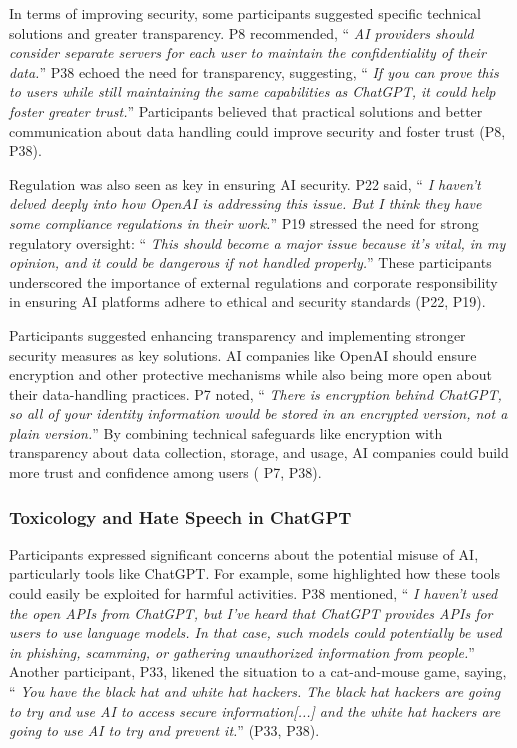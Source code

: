\documentclass[sigconf]{acmart}
\begin{document}
In terms of improving security, some participants suggested specific technical solutions and greater transparency. P8 recommended, \enquote { \emph {AI providers should consider separate servers for each user to maintain the confidentiality of their data.}} P38 echoed the need for transparency, suggesting, \enquote { \emph {If you can prove this to users while still maintaining the same capabilities as ChatGPT, it could help foster greater trust.}} Participants believed that practical solutions and better communication about data handling could improve security and foster trust (P8, P38).

Regulation was also seen as key in ensuring AI security. P22 said, \enquote { \emph {I haven’t delved deeply into how OpenAI is addressing this issue. But I think they have some compliance regulations in their work.}} P19 stressed the need for strong regulatory oversight: \enquote { \emph {This should become a major issue because it’s vital, in my opinion, and it could be dangerous if not handled properly.}} These participants underscored the importance of external regulations and corporate responsibility in ensuring AI platforms adhere to ethical and security standards (P22, P19).

Participants suggested enhancing transparency and implementing stronger security measures as key solutions. AI companies like OpenAI should ensure encryption and other protective mechanisms while also being more open about their data-handling practices. P7 noted, \enquote { \emph {There is encryption behind ChatGPT, so all of your identity information would be stored in an encrypted version, not a plain version.}} By combining technical safeguards like encryption with transparency about data collection, storage, and usage, AI companies could build more trust and confidence among users ( P7, P38).

\subsubsection{ Toxicology and Hate Speech in ChatGPT}
\hfill \break

Participants expressed significant concerns about the potential misuse of AI, particularly tools like ChatGPT. For example, some highlighted how these tools could easily be exploited for harmful activities. P38 mentioned, \enquote { \emph {I haven’t used the open APIs from ChatGPT, but I’ve heard that ChatGPT provides APIs for users to use language models. In that case, such models could potentially be used in phishing, scamming, or gathering unauthorized information from people.}} Another participant, P33, likened the situation to a cat-and-mouse game, saying, \enquote { \emph {You have the black hat and white hat hackers. The black hat hackers are going to try and use AI to access secure information[...] and the white hat hackers are going to use AI to try and prevent it.}} (P33, P38).
\end{document}
